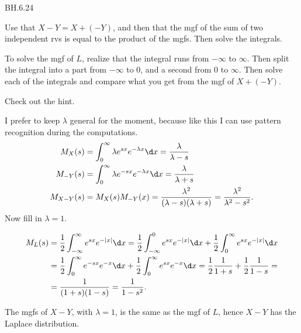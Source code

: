 
\setcounter{theorem}{23}
\begin{exercise} BH.6.24
\begin{hint}
Use that $X-Y = X+(-Y)$, and then that the mgf of the sum of two independent rvs  is equal to the product of the mgfs. Then solve the integrals.

To solve the mgf of $L$, realize that the integral runs from $-\infty$ to $\infty$. Then split the integral into a part from $-\infty$ to 0, and a second from $0$ to $\infty$. Then solve each of the integrals and compare what you get from the mgf of $X+(-Y)$.
\end{hint}

\begin{solution}
Check out the hint.

I prefer to keep $\lambda$ general for the moment, because like this I can use pattern recognition during the computations.
\begin{align*}
  M_{X}(s) &= \int_0^{\infty} \lambda e^{sx} e^{-\lambda x}\d x = \frac{\lambda}{\lambda - s}\\
  M_{-Y}(s) &= \int_0^{\infty} \lambda e^{-sx} e^{-\lambda x}\d x = \frac{\lambda}{\lambda +s}\\
  M_{X-Y}(s) &= M_X(s) M_{-Y}(x) = \frac{\lambda^{2}}{(\lambda-s)(\lambda+s)} = \frac{\lambda^{2}}{\lambda^{2}-s^2}.
\end{align*}
Now fill in $\lambda=1$.

\begin{align*}
  M_L(s) &= \frac{1}{2}\int_{-\infty}^{\infty} e^{sx} e^{-|x|}\d x = \frac{1}{2} \int_{-\infty}^{0} e^{sx} e^{-|x|}\d x + \frac{1}{2} \int_{0}^{\infty} e^{sx} e^{-|x|}\d x  \\
 &= \frac{1}{2} \int_{0}^{\infty} e^{-sx} e^{-x}\d x + \frac{1}{2} \int_{0}^{\infty} e^{sx} e^{-x}\d x  = \frac{1}{2} \frac{1}{1+s} + \frac{1}{2}\frac{1}{1-s} = \\
&=\frac{1}{(1+s)(1-s)} = \frac{1}{1-s^{2}}.
\end{align*}

The  mgfs of $X-Y$, with $\lambda=1$, is the  same as the mgf of $L$, hence $X-Y$ has the Laplace distribution.
\end{solution}
\end{exercise}

